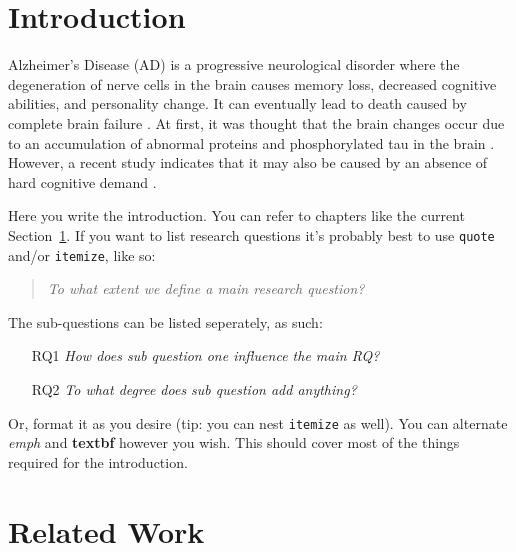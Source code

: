 \documentclass[11pt, a4paper]{article}
\begin{document}
\section{Introduction} \label{sec:introduction}
Alzheimer’s Disease (AD) is a progressive neurological disorder where the degeneration of nerve cells in the brain causes memory loss, decreased cognitive abilities, and personality change. It can eventually lead to death caused by complete brain failure \citep{BrightFocusFoundation2022Alzheimers:Stats}. At first, it was thought that the brain changes occur due to an accumulation of abnormal proteins and phosphorylated tau in the brain \citep{20222022Figures}. However, a recent study indicates that it may also be caused by an absence of hard cognitive demand \citep{Turknett2022DemandDementia}.

Here you write the introduction. You can refer to chapters like the current Section~\ref{sec:introduction}. If you want to list research questions it's probably best to use \texttt{quote} and/or \texttt{itemize}, like so:

\begin{quote}
\emph{To what extent we define a main research question?}
\end{quote}



\noindent The sub-questions can be listed seperately, as such:

\begin{itemize}
    \item[RQ1] \emph{How does sub question one influence the main RQ?}
    \item[RQ2] \emph{To what degree does sub question add anything?}
\end{itemize}

\noindent Or, format it as you desire (tip: you can nest \texttt{itemize} as well). You can alternate \emph{emph} and \textbf{textbf} however you wish. This should cover most of the things required for the introduction.

\section{Related Work}
\end{document}
